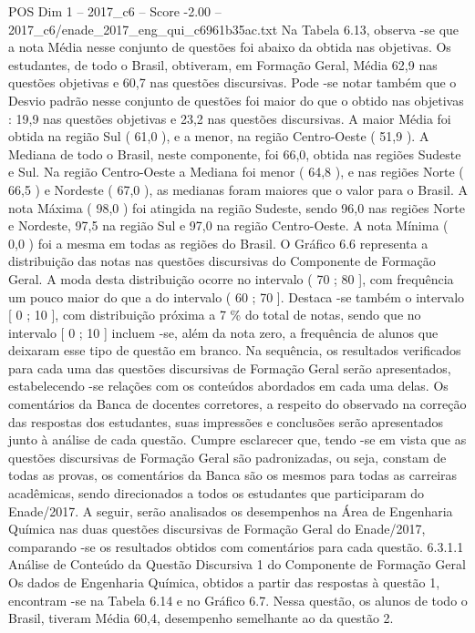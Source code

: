 \begin{textsample}{POS Dim 1 – 2017\_c6 – Score -2.00 – 2017\_c6/enade\_2017\_eng\_qui\_c6961b35ac.txt}
Na Tabela 6.13, observa -se que a nota Média nesse conjunto de questões foi abaixo da obtida nas objetivas.
Os estudantes, de todo o Brasil, obtiveram, em Formação Geral, Média 62,9 nas questões objetivas e 60,7 nas questões discursivas.
Pode -se notar também que o Desvio padrão nesse conjunto de questões foi maior do que o obtido nas objetivas : 19,9 nas questões objetivas e 23,2 nas questões discursivas.
A maior Média foi obtida na região Sul ( 61,0 ), e a menor, na região Centro-Oeste ( 51,9 ).
A Mediana de todo o Brasil, neste componente, foi 66,0, obtida nas regiões Sudeste e Sul.
Na região Centro-Oeste a Mediana foi menor ( 64,8 ), e nas regiões Norte ( 66,5 ) e Nordeste ( 67,0 ), as medianas foram maiores que o valor para o Brasil.
A nota Máxima ( 98,0 ) foi atingida na região Sudeste, sendo 96,0 nas regiões Norte e Nordeste, 97,5 na região Sul e 97,0 na região Centro-Oeste.
A nota Mínima ( 0,0 ) foi a mesma em todas as regiões do Brasil.
O Gráfico 6.6 representa a distribuição das notas nas questões discursivas do Componente de Formação Geral.
A moda desta distribuição ocorre no intervalo ( 70 ; 80 ], com frequência um pouco maior do que a do intervalo ( 60 ; 70 ].
Destaca -se também o intervalo [ 0 ; 10 ], com distribuição próxima a 7 \% do total de notas, sendo que no intervalo [ 0 ; 10 ] incluem -se, além da nota zero, a frequência de alunos que deixaram esse tipo de questão em branco.
Na sequência, os resultados verificados para cada uma das questões discursivas de Formação Geral serão apresentados, estabelecendo -se relações com os conteúdos abordados em cada uma delas.
Os comentários da Banca de docentes corretores, a respeito do observado na correção das respostas dos estudantes, suas impressões e conclusões serão apresentados junto à análise de cada questão.
Cumpre esclarecer que, tendo -se em vista que as questões discursivas de Formação Geral são padronizadas, ou seja, constam de todas as provas, os comentários da Banca são os mesmos para todas as carreiras acadêmicas, sendo direcionados a todos os estudantes que participaram do Enade/2017.
A seguir, serão analisados os desempenhos na Área de Engenharia Química nas duas questões discursivas de Formação Geral do Enade/2017, comparando -se os resultados obtidos com comentários para cada questão. 6.3.1.1 Análise de Conteúdo da Questão Discursiva 1 do Componente de Formação Geral Os dados de Engenharia Química, obtidos a partir das respostas à questão 1, encontram -se na Tabela 6.14 e no Gráfico 6.7.
Nessa questão, os alunos de todo o Brasil, tiveram Média 60,4, desempenho semelhante ao da questão 2.

\end{textsample}
